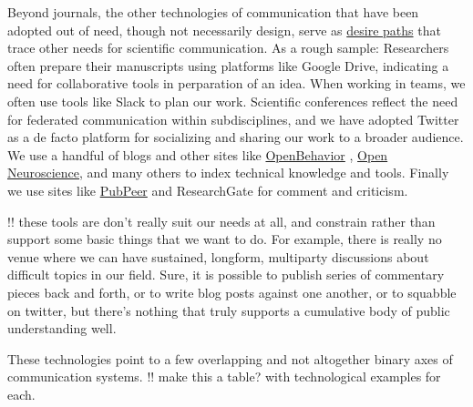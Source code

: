 \documentclass[10pt]{tufte-book}
\begin{document}
Beyond journals, the other technologies of communication that have been
adopted out of need, though not necessarily design, serve as
\href{https://en.wikipedia.org/wiki/Desire_path}{desire paths} that
trace other needs for scientific communication. As a rough sample:
Researchers often prepare their manuscripts using platforms like Google
Drive, indicating a need for collaborative tools in perparation of an
idea. When working in teams, we often use tools like Slack to plan our
work. Scientific conferences reflect the need for federated
communication within subdisciplines, and we have adopted Twitter as a de
facto platform for socializing and sharing our work to a broader
audience. We use a handful of blogs and other sites like
\href{https://edspace.american.edu/openbehavior/}{OpenBehavior} \citep{whiteFutureOpenOpenSource2019} ,
\href{https://open-neuroscience.com/}{Open Neuroscience}, and many
others to index technical knowledge and tools. Finally we use sites like
\href{https://pubpeer.com}{PubPeer} and ResearchGate for comment and
criticism.

!! these tools are don't really suit our needs at all, and constrain
rather than support some basic things that we want to do. For example,
there is really no venue where we can have sustained, longform,
multiparty discussions about difficult topics in our field. Sure, it is
possible to publish series of commentary pieces back and forth, or to
write blog posts against one another, or to squabble on twitter, but
there's nothing that truly supports a cumulative body of public
understanding well.

These technologies point to a few overlapping and not altogether binary
axes of communication systems. !! make this a table? with technological
examples for each.
\end{document}
